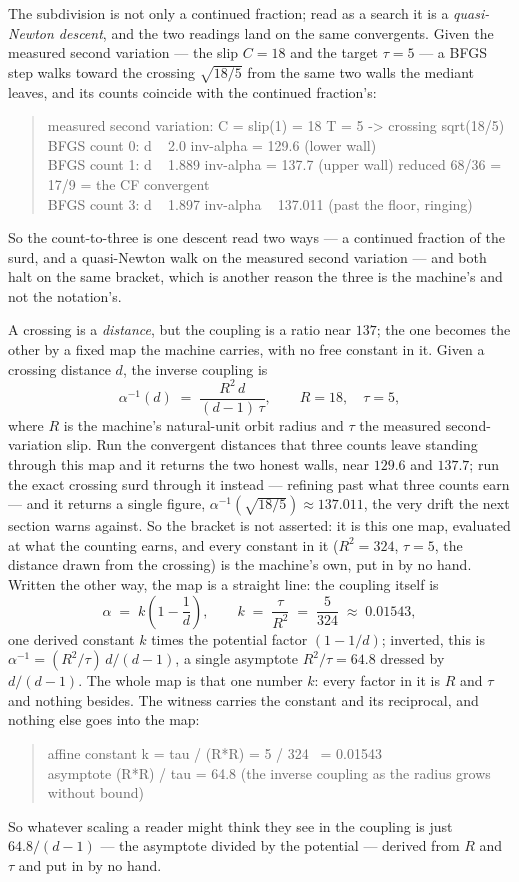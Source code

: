 The subdivision is not only a continued fraction; read as a search it is a \emph{quasi-Newton descent}, and the two
readings land on the same convergents.
Given the measured second variation --- the slip $C=18$ and the target $\tau=5$ --- a BFGS step walks toward the crossing
$\sqrt{18/5}$ from the same two walls the mediant leaves, and its counts coincide with the continued fraction's:
\begin{quote}\ttfamily
measured second variation: C = slip(1) = 18   T = 5   ->  crossing sqrt(18/5)\\
BFGS count 0:  d ~ 2.0     inv-alpha = 129.6    (lower wall)\\
BFGS count 1:  d ~ 1.889   inv-alpha = 137.7    (upper wall)  reduced 68/36 = 17/9 = the CF convergent\\
BFGS count 3:  d ~ 1.897   inv-alpha ~ 137.011  (past the floor, ringing)
\end{quote}
So the count-to-three is one descent read two ways --- a continued fraction of the surd, and a quasi-Newton walk on the
measured second variation --- and both halt on the same bracket, which is another reason the three is the machine's and
not the notation's.

A crossing is a \emph{distance}, but the coupling is a ratio near $137$; the one becomes the other by a fixed map the
machine carries, with no free constant in it.
Given a crossing distance $d$, the inverse coupling is
\[
  \alpha^{-1}(d) \;=\; \frac{R^{2}\,d}{(d-1)\,\tau}, \qquad R = 18, \quad \tau = 5,
\]
where $R$ is the machine's natural-unit orbit radius and $\tau$ the measured second-variation slip.
Run the convergent distances that three counts leave standing through this map and it returns the two honest walls, near
$129.6$ and $137.7$; run the exact crossing surd through it instead --- refining past what three counts earn --- and it
returns a single figure, $\alpha^{-1}(\sqrt{18/5}) \approx 137.011$, the very drift the next section warns against.
So the bracket is not asserted: it is this one map, evaluated at what the counting earns, and every constant in it
($R^{2}=324$, $\tau=5$, the distance drawn from the crossing) is the machine's own, put in by no hand.
Written the other way, the map is a straight line: the coupling itself is
\[
  \alpha \;=\; k\left(1 - \frac{1}{d}\right), \qquad k \;=\; \frac{\tau}{R^{2}} \;=\; \frac{5}{324} \;\approx\; 0.01543,
\]
one derived constant $k$ times the potential factor $(1 - 1/d)$; inverted, this is
$\alpha^{-1} = (R^{2}/\tau)\, d/(d-1)$, a single asymptote $R^{2}/\tau = 64.8$ dressed by $d/(d-1)$.
The whole map is that one number $k$: every factor in it is $R$ and $\tau$ and nothing besides.
The witness carries the constant and its reciprocal, and nothing else goes into the map:
\begin{quote}\ttfamily
affine constant k = tau / (R*R) = 5 / 324 ~= 0.01543\\
asymptote (R*R) / tau = 64.8   (the inverse coupling as the radius grows without bound)
\end{quote}
So whatever scaling a reader might think they see in the coupling is just $64.8/(d-1)$ --- the asymptote divided by the
potential --- derived from $R$ and $\tau$ and put in by no hand.

